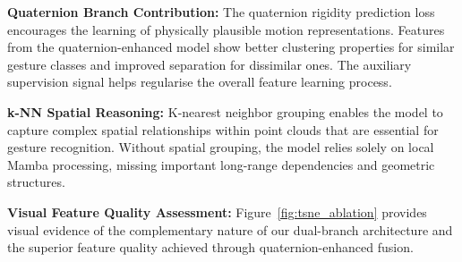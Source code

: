 \documentclass[journal]{IEEEtran}
\theoremstyle{plain}
\begin{document}
\textbf{Quaternion Branch Contribution:} The quaternion rigidity prediction loss encourages the learning of physically plausible motion representations. Features from the quaternion-enhanced model show better clustering properties for similar gesture classes and improved separation for dissimilar ones. The auxiliary supervision signal helps regularise the overall feature learning process.

\textbf{k-NN Spatial Reasoning:} K-nearest neighbor grouping enables the model to capture complex spatial relationships within point clouds that are essential for gesture recognition. Without spatial grouping, the model relies solely on local Mamba processing, missing important long-range dependencies and geometric structures.

\textbf{Visual Feature Quality Assessment:} Figure~\ref{fig:tsne_ablation} provides visual evidence of the complementary nature of our dual-branch architecture and the superior feature quality achieved through quaternion-enhanced fusion.
\end{document}
